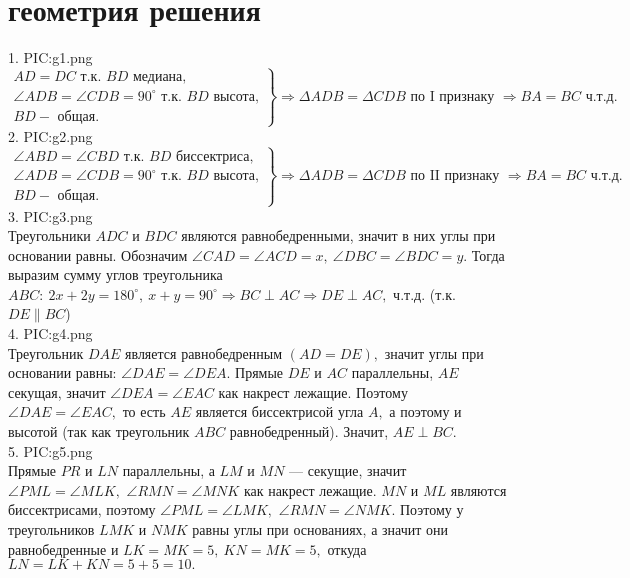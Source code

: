 \section{геометрия решения}
1. {{PIC:g1.png}}\\
$\left.\begin{array}{l}AD=DC\text{ т.к. }BD\text{ медиана,}\\
\angle ADB=\angle CDB=90^\circ \text{ т.к. }BD\text{ высота,}\\
BD - \text{ общая.}   \end{array}\right\}\Rightarrow
\Delta ADB=\Delta CDB\text{ по I признаку }\Rightarrow BA=BC\text{ ч.т.д.} $\\
2.  {{PIC:g2.png}}\\
$\left.\begin{array}{l}\angle ABD=\angle CBD\text{ т.к. }BD\text{ биссектриса,}\\
\angle ADB=\angle CDB=90^\circ \text{ т.к. }BD\text{ высота,}\\
BD - \text{ общая.}   \end{array}\right\}\Rightarrow
\Delta ADB=\Delta CDB\text{ по II признаку }\Rightarrow BA=BC\text{ ч.т.д.} $\\
3. {{PIC:g3.png}}\\
Треугольники $ADC$ и $BDC$ являются равнобедренными, значит в них углы при основании равны. Обозначим $\angle CAD=\angle ACD=x,\ \angle DBC=\angle BDC=y.$ Тогда выразим сумму углов треугольника $ABC:\ 2x+2y=180^\circ,\ x+y=90^\circ\Rightarrow BC \perp AC\Rightarrow DE\perp AC,$ ч.т.д. (т.к. $DE\parallel BC$)\\
4. {{PIC:g4.png}}\\
Треугольник $DAE$ является равнобедренным $(AD=DE),$ значит углы при основании равны: $\angle DAE=\angle DEA.$ Прямые $DE$ и $AC$ параллельны, $AE$ секущая, значит  $\angle DEA=\angle EAC$ как накрест лежащие. Поэтому $\angle DAE=\angle EAC,$ то есть $AE$ является биссектрисой угла $A,$ а поэтому и высотой (так как треугольник $ABC$ равнобедренный). Значит, $AE\perp BC.$\\
5. {{PIC:g5.png}}\\
Прямые $PR$ и $LN$ параллельны, а $LM$ и $MN$ --- секущие, значит $\angle PML = \angle MLK,$  $\angle RMN= \angle MNK$ как накрест лежащие. $MN$ и $ML$ являются биссектрисами, поэтому $\angle PML = \angle LMK,$ $ \angle RMN= \angle NMK.$ Поэтому у треугольников $LMK$ и $NMK$ равны углы при основаниях, а значит они равнобедренные и $LK=MK=5,\ KN=MK=5,$ откуда $LN=LK+KN=5+5=10.$\\
